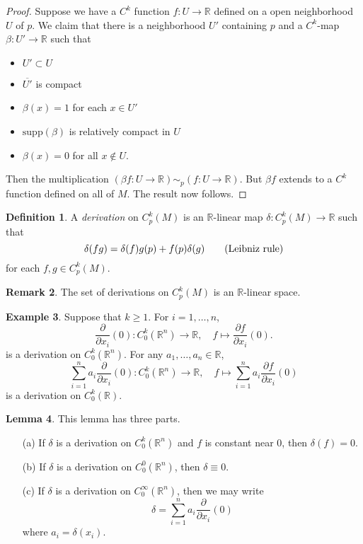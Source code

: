 \documentclass{amsart}
\numberwithin{equation}{section}
\newcommand{\bR}{\mathbb{R}}
\theoremstyle{definition}
\newtheorem{definition}{Definition} [section]
\newtheorem{example}[definition]{Example}
\newtheorem{remark}[definition]{Remark}
\theoremstyle{theorem}
\newtheorem{lemma}[definition]{Lemma}
\begin{document}
\begin{proof}
Suppose we have a $C^k$ function $f : U \to \bR$ defined on a open neighborhood $U$ of $p$. 
We claim that there is a neighborhood $U'$ containing $p$ and a $C^k$-map $\beta : U' \to \mathbb{R}$ such that 
\begin{itemize}
\item $U' \subset U$
\item $\overline{U'}$ is compact
\item $\beta(x) = 1$ for each $x \in U'$
\item $\text{supp}(\beta)$ is relatively compact in $U$ 
\item $\beta(x) = 0$ for all $x \notin U$. 
\end{itemize}
Then the multiplication $(\beta f : U \to \mathbb{R})\sim_p (f : U \to \mathbb{R})$. But $\beta f$ extends to a $C^k$ 
function defined on all of $M$. The result now follows. 
\end{proof}

\begin{definition}
A {\em derivation} on $C_p^k(M)$ is an $\bR$-linear map $\delta : C_p^k(M) \to \mathbb{R}$ such that 
\[
\delta(fg) = \delta(f)g(p) + f(p)\delta(g) \quad\quad \textup{(Leibniz rule)}
\]
for each $f,g \in C_p^k(M)$. 
\end{definition}

\begin{remark}
The set of derivations on $C_p^k(M)$ is an $\bR$-linear space. 
\end{remark}

\begin{example}  Suppose that $k\geq 1$. For $i=1,\ldots,n$,
$$
\frac{\partial}{\partial x_i}(0): C_0^k(\mathbb{R}^n)\to \bR,\quad
f \mapsto \frac{\partial f}{\partial x_i}(0).
$$
is a derivation on $C_0^k(\bR^n)$. For any $a_1,\ldots, a_n\in \bR$,
$$
\sum_{i=1}^n a_i \frac{\partial}{\partial x_i}(0): C_0^k(\mathbb{R}^n)\to \bR,\quad
f \mapsto \sum_{i=1}^n a_i \frac{\partial f}{\partial x_i}(0)
$$
is a derivation on $C_0^k(\bR)$.

\end{example}


\begin{lemma}
This lemma has three parts. 
\begin{enumerate}
\item[(a)] If $\delta$ is a derivation on $C_0^k(\mathbb{R}^n)$ and $f$ is constant near 0, then $\delta(f) = 0$. 
\item[(b)] If $\delta$ is a derivation on $C_0^0(\mathbb{R}^n)$, then $\delta \equiv 0$. 
\item[(c)] If $\delta$ is a derivation on $C_0^\infty(\mathbb{R}^n)$, then we may write 
\[
\delta = \sum_{i=1}^n a_i \frac{\partial}{\partial x_i}(0)
\]
where $a_i = \delta(x_i)$.
\end{enumerate}
\end{lemma}
\end{document}
